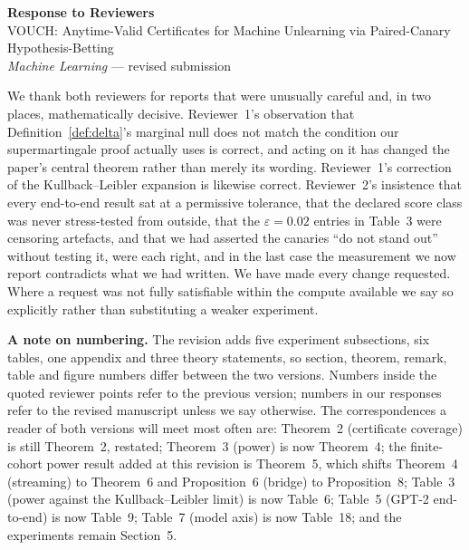 \documentclass[11pt,a4paper]{article}
\newcommand{\eps}{\varepsilon}
\begin{document}
\begin{center}
{\Large\bfseries Response to Reviewers}\\[0.6em]
{\large VOUCH: Anytime-Valid Certificates for Machine Unlearning via
Paired-Canary Hypothesis-Betting}\\[0.4em]
\emph{Machine Learning} --- revised submission
\end{center}

\bigskip

\noindent We thank both reviewers for reports that were unusually careful and, in two
places, mathematically decisive. Reviewer~1's observation that Definition~\ref{def:delta}'s marginal
null does not match the condition our supermartingale proof actually uses is correct,
and acting on it has changed the paper's central theorem rather than merely its
wording. Reviewer~1's correction of the Kullback--Leibler expansion is likewise
correct. Reviewer~2's insistence that every end-to-end result sat at a permissive
tolerance, that the declared score class was never stress-tested from outside, that the
$\eps=0.02$ entries in Table~3 were censoring artefacts, and that we had asserted the
canaries ``do not stand out'' without testing it, were each right, and in the last case
the measurement we now report contradicts what we had written. We have made every
change requested. Where a request was not fully satisfiable within the compute
available we say so explicitly rather than substituting a weaker experiment.

\medskip
\noindent\textbf{A note on numbering.} The revision adds five experiment subsections,
six tables, one appendix and three theory statements, so section, theorem, remark,
table and figure numbers differ between the two versions. Numbers inside the quoted
reviewer points refer to the previous version; numbers in our responses refer to the
revised manuscript unless we say otherwise. The correspondences a reader of both
versions will meet most often are: Theorem~2 (certificate coverage) is still
Theorem~2, restated; Theorem~3 (power) is now Theorem~4; the finite-cohort power
result added at this revision is Theorem~5, which shifts Theorem~4 (streaming) to
Theorem~6 and Proposition~6 (bridge) to Proposition~8; Table~3 (power against the
Kullback--Leibler limit) is now Table~6; Table~5 (GPT-2 end-to-end) is now Table~9;
Table~7 (model axis) is now Table~18; and the experiments remain Section~5.
\end{document}
